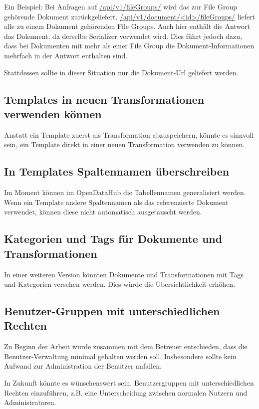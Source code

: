 Ein Beispiel:
Bei Anfragen auf \url{/api/v1/fileGroups/} wird das zur File Group gehörende Dokument zurückgeliefert.
\url{/api/v1/document/<id>/fileGroups/} liefert alle zu einem Dokument gehörenden File Groups. Auch hier enthält die Antwort das Dokument, da derselbe Serializer verwendet wird. Dies führt jedoch dazu, dass bei Dokumenten mit mehr als einer File Group die Dokument-Informationen mehrfach in der Antwort enthalten sind.

Stattdessen sollte in dieser Situation nur die Dokument-Url geliefert werden.

\subsection{Templates in neuen Transformationen verwenden können}
Anstatt ein Template zuerst als Transformation abzuspeichern, könnte es sinnvoll sein, ein Template direkt in einer neuen Transformation verwenden zu können.

\subsection{In Templates Spaltennamen überschreiben}
Im Moment können im OpenDataHub die Tabellennamen generalisiert werden. Wenn ein Template andere Spaltennamen als das referenzierte Dokument verwendet, können diese nicht automatisch ausgetauscht werden.

\subsection{Kategorien und Tags für Dokumente und Transformationen}
In einer weiteren Version könnten Dokumente und Transformationen mit Tags und Kategorien versehen werden. Dies würde die Übersichtlichkeit erhöhen.

\subsection{Benutzer-Gruppen mit unterschiedlichen Rechten}
Zu Beginn der Arbeit wurde zusammen mit dem Betreuer entschieden, dass die Benutzer-Verwaltung minimal gehalten werden soll. Insbesondere sollte kein Aufwand zur Administration der Benutzer anfallen.

In Zukunft könnte es wünschenswert sein, Benutzergruppen mit unterschiedlichen Rechten einzuführen, z.B. eine Unterscheidung zwischen normalen Nutzern und Administratoren.